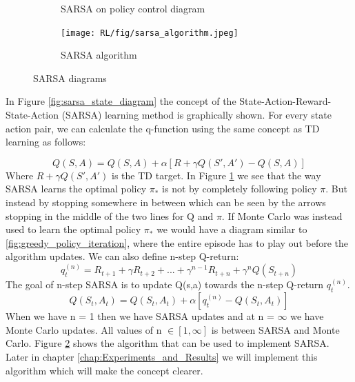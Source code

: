 \begin{figure}[!htb]
\begin{subfigure}{.49\textwidth}
		\caption{SARSA on policy control diagram\cite{David_Silver}}
		\label{fig:sarsa_on_policy}
	\end{subfigure}
	\begin{subfigure}{1\textwidth}
		\centering
		\texttt{[image: RL/fig/sarsa\_algorithm.jpeg]}
		\caption{SARSA algorithm\cite{David_Silver}}
		\label{fig:sarsa_algorithm}
	\end{subfigure}
	\caption{SARSA diagrams \cite{David_Silver}}
	\label{fig:sarsa}	
\end{figure}
In Figure \ref{fig:sarsa_state_diagram} the concept of the State-Action-Reward-State-Action (SARSA) learning method is graphically shown. For every state action pair, we can calculate the q-function using the same concept as TD learning as follows:

\begin{equation}
	Q(S,A) = Q(S,A) + \alpha[R+\gamma Q(S',A') - Q(S,A)]
	\label{eq:sarsa_update}
\end{equation}
Where $R+\gamma Q(S',A')$ is the TD target. In Figure \ref{fig:sarsa_on_policy} we see that the way SARSA learns the optimal policy $\pi_{*}$ is not by completely following policy $\pi$. But instead by stopping somewhere in between which can be seen by the arrows stopping in the middle of the two lines for Q and $\pi$. If Monte Carlo was instead used to learn the optimal policy $\pi_{*}$ we would have a diagram similar to \ref{fig:greedy_policy_iteration}, where the entire episode has to play out before the algorithm updates.
We can also define n-step Q-return:
\begin{equation}
	q_{t}^{(n)} = R_{t+1} + \gamma R_{t+2} +...+ \gamma^{n-1}R_{t+n}+\gamma^{n}Q(S_{t+n})
	\label{eq:q_return}
\end{equation}
The goal of n-step SARSA is to update Q(s,a) towards the n-step Q-return $q_t^{(n)}$.
\begin{equation}
	Q(S_t,A_t) = Q(S_t,A_t) + \alpha[q_{t}^{(n)} - Q(S_t,A_t)]
	\label{eq:sarsa_n_step}
\end{equation}
When we have n = 1 then we have SARSA updates and at n = $\infty$ we have Monte Carlo updates. All values of n $\in [1,\infty]$ is between SARSA and Monte Carlo.
Figure \ref{fig:sarsa_algorithm} shows the algorithm that can be used to implement SARSA. Later in chapter \ref{chap:Experiments_and_Results} we will implement this algorithm which will make the concept clearer.
